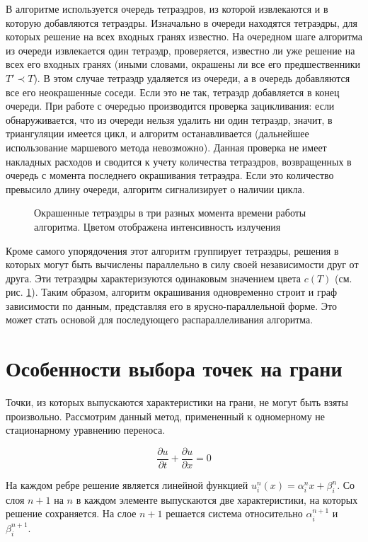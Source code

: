 В алгоритме используется очередь тетраэдров, из которой извлекаются и в которую добавляются тетраэдры. Изначально в очереди находятся тетраэдры, для которых решение на всех входных гранях известно. На очередном шаге алгоритма из очереди извлекается один тетраэдр, проверяется, известно ли уже решение на всех его входных гранях (иными словами, окрашены ли все его предшественники $T' \prec T$). В этом случае тетраэдр удаляется из очереди, а в очередь добавляются все его неокрашенные соседи. Если это не так, тетраэдр добавляется в конец очереди. При работе с очередью производится проверка зацикливания: если обнаруживается, что из очереди нельзя удалить ни один тетраэдр, значит, в триангуляции имеется цикл, и алгоритм останавливается (дальнейшее использование маршевого метода невозможно). Данная проверка не имеет накладных расходов и сводится к учету количества тетраэдров, возвращенных в очередь с момента последнего окрашивания тетраэдра. Если это количество превысило длину очереди, алгоритм сигнализирует о наличии цикла.

\begin{figure}[ht!]
\caption{Окрашенные тетраэдры в три разных момента времени работы алгоритма. Цветом отображена интенсивность излучения}
\label{fig:13}
\end{figure} 

Кроме самого упорядочения этот алгоритм группирует тетраэдры, решения в которых могут быть вычислены параллельно в силу своей независимости друг от друга. Эти тетраэдры характеризуются одинаковым значением цвета $c(T)$ (см. рис. \ref{fig:13}). Таким образом, алгоритм окрашивания одновременно строит и граф зависимости по данным, представляя его в ярусно-параллельной форме. Это может стать основой для последующего распараллеливания алгоритма.
\section{Особенности выбора точек на грани}
Точки, из которых выпускаются характеристики на грани, не могут быть взяты произвольно. Рассмотрим данный метод, примененный к одномерному не стационарному уравнению переноса.

\begin {equation}
\frac{\partial u}{\partial t} + \frac{\partial u}{\partial x} = 0
\end {equation}

На каждом ребре решение является линейной функцией $u_i^n(x) = \alpha_i^nx+\beta_i^n $. Со слоя $n+1$ на $n$ в каждом элементе выпускаются две характеристики, на которых решение сохраняется. На слое $n+1$ решается система относительно $\alpha_i^{n+1}$ и $\beta_i^{n+1}$. 

